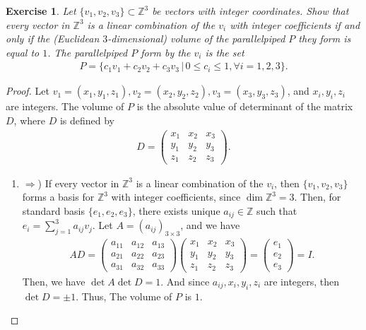 \documentclass[11pt]{article}
\newtheorem{exercise}{Exercise}[section]
\theoremstyle{definition}
\numberwithin{equation}{subsection}
\begin{document}
\begin{exercise}{\rm *}
Let $\{v_1, v_2, v_3\} \subset \mathbb{Z}^3$ be vectors with integer coordinates. Show that every vector in $\mathbb{Z}^3$ is a linear combination of the $v_i$ with integer coefficients if and only if the (Euclidean $3$-dimensional) volume of the parallelpiped $P$ they form is equal to $1$. The parallelpiped $P$ form by the $v_i$ is the set 
\begin{align*}
    P = \{c_1 v_1 + c_2 v_2 + c_3 v_3 \, | \, 0 \leq c_i \leq 1, \forall i = 1,2,3\}.
\end{align*}
\end{exercise}
\begin{proof}
Let $v_1 = (x_1, y_1, z_1), v_2 = (x_2, y_2, z_2), v_3 = (x_3, y_3, z_3)$, and $x_i, y_i, z_i$ are integers. The volume of $P$ is the absolute value of determinant of the matrix $D$, where $D$ is defined by
\begin{align*}
    D = \begin{pmatrix}
        x_1 & x_2 & x_3 \\
        y_1 & y_2 & y_3 \\
        z_1 & z_2 & z_3
    \end{pmatrix}.
\end{align*}
\begin{enumerate}[label=(\alph*)]
    \item $\Rightarrow$) If every vector in $\mathbb{Z}^3$ is a linear combination of the $v_i$, then $\{v_1, v_2, v_3\}$ forms a basis for $\mathbb{Z}^3$ with integer coefficients, since $\dim \mathbb{Z}^3 = 3$. Then, for standard basis $\{e_1, e_2, e_3\}$, there exists unique $a_{ij} \in \mathbb{Z}$ such that $e_i = \sum^3_{j=1}a_{ij} v_j$. Let $A = (a_{ij})_{3 \times 3}$, and we have
    \begin{align*}
        AD = \begin{pmatrix}
        a_{11} & a_{12} & a_{13} \\
        a_{21} & a_{22} & a_{23} \\
        a_{31} & a_{32} & a_{33}
    \end{pmatrix}\begin{pmatrix}
        x_1 & x_2 & x_3 \\
        y_1 & y_2 & y_3 \\
        z_1 & z_2 & z_3
    \end{pmatrix} = \begin{pmatrix}
        e_1 \\
        e_2 \\
        e_3
    \end{pmatrix} = I.
    \end{align*}
    Then, we have $\det A \det D = 1$. And since $a_{ij}, x_i, y_i, z_i$ are integers, then $\det D = \pm 1$. Thus, The volume of $P$ is $1$.
    

\end{enumerate}
\end{proof}
\end{document}
